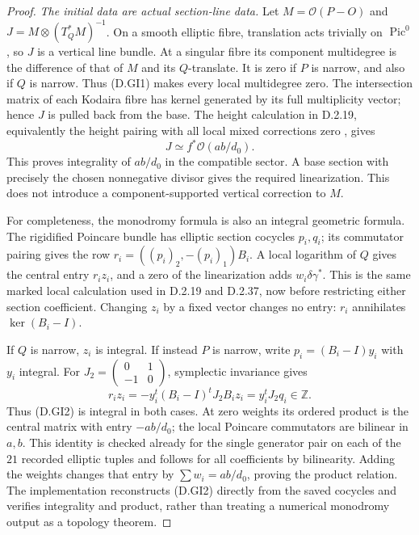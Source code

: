 \begin{proof}
\emph{The initial data are actual section-line data.}
Let $M=\mathcal O(P-O)$ and
$J=M\otimes(T_Q^*M)^{-1}$. On a smooth elliptic fibre,
translation acts trivially on $\operatorname{Pic}^0$, so
$J$ is a vertical line bundle. At a singular fibre its
component multidegree is the difference of that of $M$
and its $Q$-translate. It is zero if $P$ is narrow, and
also if $Q$ is narrow. Thus (D.GI1) makes every local
multidegree zero. The intersection matrix of each
Kodaira fibre has kernel generated by its full
multiplicity vector; hence $J$ is pulled back from the
base. The height calculation in D.2.19, equivalently
the height pairing with all local mixed corrections
zero \cite[Section 11.8]{manSS10}, gives
\[
                         J\simeq f^*\mathcal O(ab/d_0).
\]
This proves integrality of $ab/d_0$ in the compatible
sector. A base section with precisely the chosen
nonnegative divisor gives the required linearization.
This does not introduce a component-supported vertical
correction to $M$.

For completeness, the monodromy formula is also an
integral geometric formula. The rigidified Poincare
bundle has elliptic section cocycles $p_i,q_i$; its
commutator pairing gives the row
$r_i=((p_i)_2,-(p_i)_1)B_i$. A local logarithm of $Q$
gives the central entry $r_i z_i$, and a zero of the
linearization adds $w_i\delta\gamma^*$. This is the
same marked local calculation used in D.2.19 and
D.2.37, now before restricting either section coefficient.
Changing $z_i$ by a fixed vector changes no entry:
$r_i$ annihilates $\ker(B_i-I)$.

If $Q$ is narrow, $z_i$ is integral. If instead $P$
is narrow, write $p_i=(B_i-I)y_i$ with $y_i$ integral.
For $J_2=\left(\begin{smallmatrix}0&1\\-1&0\end{smallmatrix}\right)$,
symplectic invariance gives
\[
 r_i z_i=-y_i^t(B_i-I)^tJ_2B_i z_i
                         =y_i^tJ_2q_i\in\mathbb Z.
\]
Thus (D.GI2) is integral in both cases. At zero weights
its ordered product is the central matrix with entry
$-ab/d_0$; the local Poincare commutators are bilinear
in $a,b$. This identity is checked already for the
single generator pair on each of the $21$ recorded
elliptic tuples and follows for all coefficients by
bilinearity. Adding the weights changes that entry by
$\sum w_i=ab/d_0$, proving the product relation.
The implementation reconstructs (D.GI2) directly from
the saved cocycles and verifies integrality and product,
rather than treating a numerical monodromy output as
a topology theorem.


\end{proof}
